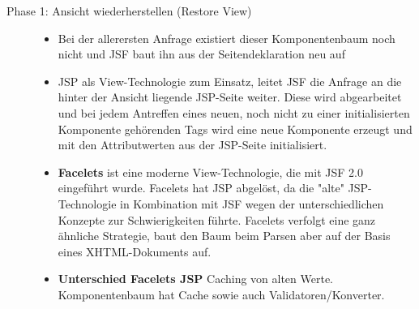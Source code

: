 \documentclass[a4paper,10pt]{scrreprt}
\begin{document}
{\begin{description}
 \item [Phase 1: Ansicht wiederherstellen (Restore View)] \begin{itemize}
                                                           \item Bei der allerersten Anfrage existiert dieser Komponentenbaum noch nicht und JSF baut ihn aus der
Seitendeklaration neu auf
\item JSP als View-Technologie
zum Einsatz, leitet JSF die Anfrage an die hinter der Ansicht liegende JSP-Seite weiter. Diese wird
abgearbeitet und bei jedem Antreffen eines neuen, noch nicht zu einer initialisierten Komponente
gehörenden Tags wird eine neue Komponente erzeugt und mit den Attributwerten aus der JSP-Seite
initialisiert.
\item \textbf{Facelets} ist eine moderne View-Technologie, die mit JSF 2.0 eingeführt wurde. Facelets hat JSP
abgelöst, da die "alte" JSP-Technologie in Kombination mit JSF wegen der unterschiedlichen
Konzepte zur Schwierigkeiten führte. Facelets verfolgt eine ganz ähnliche Strategie, baut den Baum
beim Parsen aber auf der Basis eines XHTML-Dokuments auf.
\item \textbf{Unterschied Facelets JSP} Caching von alten Werte. Komponentenbaum hat Cache sowie auch Validatoren/Konverter.


\end{itemize}
\end{description}}
\end{document}
